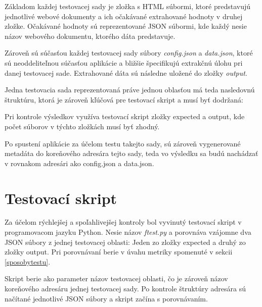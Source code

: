 Základom každej testovacej sady je zložka s HTML súbormi, ktoré predstavujú jednotlivé webové dokumenty a ich očakávané extrahované hodnoty v druhej zložke. Očakávané hodnoty sú reprezentované JSON súbormi, kde každý nesie názov webového dokumentu, ktorého dáta predstavuje. 

Zároveň sú súčasťou každej testovacej sady súbory \textit{config.json} a \textit{data.json}, ktoré sú neoddeliteľnou súčasťou aplikácie a bližšie špecifikujú extrakčnú úlohu pri danej testovacej sade. Extrahované dáta sú následne uložené do zložky \textit{output}.

Jedna testovacia sada reprezentovaná práve jednou oblasťou má teda nasledovnú štruktúru, ktorá je zároveň kľúčová pre testovací skript a musí byť dodržaná:

\bigskip


\bigskip

Pri kontrole výsledkov využíva testovací skript zložky expected a output, kde počet súborov v týchto zložkách musí byť zhodný.

Po spustení aplikácie za účelom testu takejto sady, sú zároveň vygenerované metadáta do koreňového adresára tejto sady, teda vo výsledku sa budú nachádzať v rovnakom adresári ako config.json a data.json.


\section{Testovací skript}

Za účelom rýchlejšej a spoľahlivejšej kontroly bol vyvinutý testovací skript v programovacom jazyku Python. Nesie názov \textit{ftest.py} a porovnáva vzájomne dva JSON súbory z jednej testovacej oblasti: Jeden zo zložky expected a druhý zo zložky output. Pri porovnávaní berie v úvahu metriky spomenuté v sekcii \ref{sposobytestu}.

Skript berie ako parameter názov testovacej oblasti, čo je zároveň názov koreňového adresáru jednej testovacej sady. Po kontrole štruktúry adresára sú načítané jednotlivé JSON súbory a skript začína s porovnávaním.

